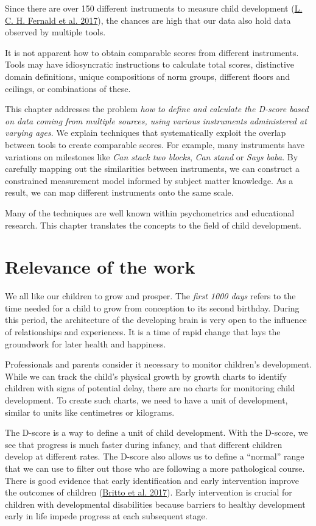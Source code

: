 \documentclass[
]{book}
\begin{document}
Since there are over 150 different instruments to measure child development (\protect\hyperlink{ref-fernald2017toolkit}{L. C. H. Fernald et al. 2017}), the chances are high that our data also hold data observed by multiple tools.

It is not apparent how to obtain comparable scores from different instruments. Tools may have idiosyncratic instructions to calculate total scores, distinctive domain definitions, unique compositions of norm groups, different floors and ceilings, or combinations of these.

This chapter addresses the problem \emph{how to define and calculate the D-score based on data coming from multiple sources, using various instruments administered at varying ages}. We explain techniques that systematically exploit the overlap between tools to create comparable scores. For example, many instruments have variations on milestones like \emph{Can stack two blocks}, \emph{Can stand} or \emph{Says baba}. By carefully mapping out the similarities between instruments, we can construct a constrained measurement model informed by subject matter knowledge. As a result, we can map different instruments onto the same scale.

Many of the techniques are well known within psychometrics and educational research. This chapter translates the concepts to the field of child development.

\hypertarget{sec:relevance}{%
\section{Relevance of the work}\label{sec:relevance}}

We all like our children to grow and prosper. The \emph{first 1000 days} refers to the time needed for a child to grow from conception to its second birthday. During this period, the architecture of the developing brain is very open to the influence of relationships and experiences. It is a time of rapid change that lays the groundwork for later health and happiness.

Professionals and parents consider it necessary to monitor children's development. While we can track the child's physical growth by growth charts to identify children with signs of potential delay, there are no charts for monitoring child development. To create such charts, we need to have a unit of development, similar to units like centimetres or kilograms.

The D-score is a way to define a unit of child development. With the D-score, we see that progress is much faster during infancy, and that different children develop at different rates. The D-score also allows us to define a ``normal'' range that we can use to filter out those who are following a more pathological course. There is good evidence that early identification and early intervention improve the outcomes of children (\protect\hyperlink{ref-britto2017}{Britto et al. 2017}). Early intervention is crucial for children with developmental disabilities because barriers to healthy development early in life impede progress at each subsequent stage.
\end{document}
